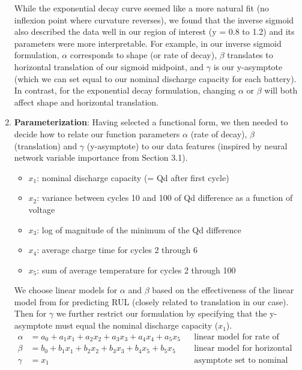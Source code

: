 \documentclass{article}
\begin{document}
\begin{enumerate}
    While the exponential decay curve seemed like a more natural fit (no inflexion point where curvature reverses), we found that the inverse sigmoid also described the data well in our region of interest (y = 0.8 to 1.2) and its parameters were more interpretable. For example, in our inverse sigmoid formulation, $\alpha$ corresponds to shape (or rate of decay), $\beta$ translates to horizontal translation of our sigmoid midpoint, and $\gamma$ is our y-asymptote (which we can set equal to our nominal discharge capacity for each battery). In contrast, for the exponential decay formulation, changing $\alpha$ or $\beta$ will both affect shape and horizontal translation. 

    \item \textbf{Parameterization}: Having selected a functional form, we then needed to decide how to relate our function parameters $\alpha$ (rate of decay), $\beta$ (translation) and $\gamma$ (y-asymptote) to our data features (inspired by neural network variable importance from Section 3.1). 

    \begin{itemize}
        \item \textbf{$x_1$}: nominal discharge capacity (= Qd after first cycle)
        \item \textbf{$x_2$}: variance between cycles 10 and 100 of Qd difference as a function of voltage 
        \item \textbf{$x_3$}: log of magnitude of the minimum of the Qd difference
        \item \textbf{$x_4$}: average charge time for cycles 2 through 6
        \item \textbf{$x_5$}: sum of average temperature for cycles 2 through 100
    \end{itemize}

    We choose linear models for $\alpha$ and $\beta$ based on the effectiveness of the linear model from \cite{severson2019data} for predicting RUL (closely related to translation in our case). Then for $\gamma$ we further restrict our formulation by specifying that the y-asymptote must equal the nominal discharge capacity ($x_1$).
    \begin{align*}
        \alpha & = a_0 + a_1 x_1 + a_2 x_2 + a_3 x_3 + a_4 x_4 + a_5 x_5 && \text{linear model for rate of decay}\\
        \beta & = b_0 + b_1 x_1 + b_2 x_2 + b_3 x_3 + b_4 x_5 + b_5 x_5 && \text{linear model for horizontal translation}\\
        \gamma & = x_1 && \text{asymptote set to nominal discharge capacity}
    \end{align*}


\end{enumerate}
\end{document}
